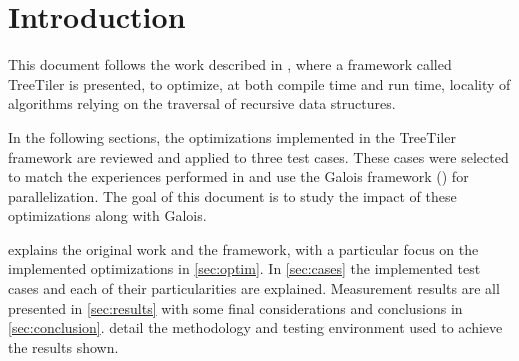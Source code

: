 \section{Introduction}
\label{sec:intro}

This document follows the work described in \cite{tree_tiler}, where a framework called TreeTiler is presented, to optimize, at both compile time and run time, locality of algorithms relying on the traversal of recursive data structures.

In the following sections, the optimizations implemented in the TreeTiler framework are reviewed and applied to three test cases. These cases were selected to match the experiences performed in \cite{tree_tiler} and use the Galois framework (\cite{galois}) for parallelization. The goal of this document is to study the impact of these optimizations along with Galois.

 explains the original work and the \treetiler framework, with a particular focus on the implemented optimizations in \cref{sec:optim}. In \cref{sec:cases} the implemented test cases and each of their particularities are explained. Measurement results are all presented in \cref{sec:results} with some final considerations and conclusions in \cref{sec:conclusion}.  detail the methodology and testing environment used to achieve the results shown.